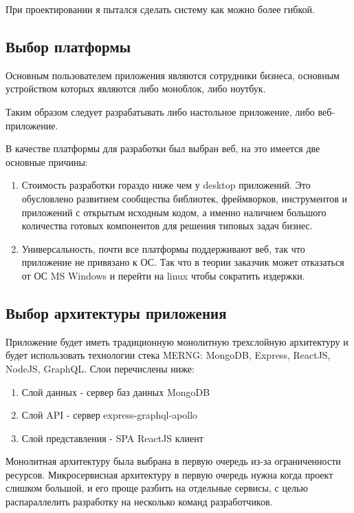 \documentclass[a4paper,article,14pt]{extarticle}
\begin{document}
При проектировании я пытался сделать систему как можно более гибкой.

\subsection{Выбор платформы}

Основным пользователем приложения являются сотрудники бизнеса, 
основным устройством которых являются либо моноблок, либо ноутбук.

Таким образом следует разрабатывать либо настольное приложение, либо веб-приложение.

В качестве платформы для разработки был выбран веб, на это имеется две основные причины:

\begin{enumerate}
    \item Стоимость разработки гораздо ниже чем у desktop приложений. Это обусловлено развитием сообщества библиотек, фреймворков, 
    инструментов и приложений с открытым исходным кодом, 
    а именно наличием большого количества готовых компонентов для решения типовых задач бизнес.
    \item Универсальность, почти все платформы поддерживают веб, так что приложение не привязано к ОС.
    Так что в теории заказчик может отказаться от ОС MS Windows и перейти на linux чтобы сократить издержки.
\end{enumerate}
\pagebreak

\subsection{Выбор архитектуры приложения}

Приложение будет иметь традиционную монолитную трехслойную архитектуру и будет использовать технологии стека MERNG: MongoDB, Express,
ReactJS, NodeJS, GraphQL. Слои перечислены ниже:

\begin{enumerate}
    \item Слой данных - сервер баз данных MongoDB
    \item Слой API - сервер express-graphql-apollo
    \item Слой представления - SPA ReactJS клиент
\end{enumerate}

Монолитная архитектуру была выбрана в первую очередь из-за ограниченности ресурсов. 
Микросервисная архитектуру в первую очередь нужна когда проект слишком большой,
и его проще разбить на отдельные сервисы, с целью распараллелить разработку на несколько команд разработчиков.
\end{document}
